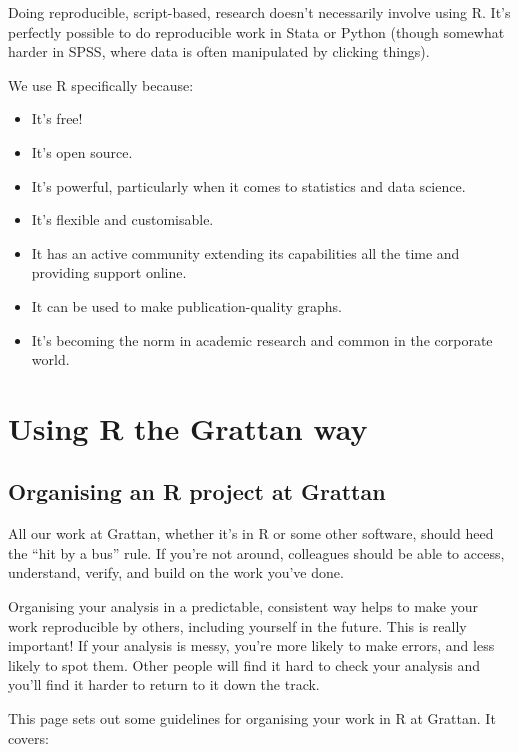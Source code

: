 \documentclass[
]{book}
\providecommand{\tightlist}{%
  \setlength{\itemsep}{0pt}\setlength{\parskip}{0pt}}
\begin{document}
Doing reproducible, script-based, research doesn't necessarily involve using R. It's perfectly possible to do reproducible work in Stata or Python (though somewhat harder in SPSS, where data is often manipulated by clicking things).

We use R specifically because:

\begin{itemize}
\tightlist
\item
  It's free!
\item
  It's open source.
\item
  It's powerful, particularly when it comes to statistics and data science.
\item
  It's flexible and customisable.
\item
  It has an active community extending its capabilities all the time and providing support online.
\item
  It can be used to make publication-quality graphs.
\item
  It's becoming the norm in academic research and common in the corporate world.
\end{itemize}

\hypertarget{part-using-r-the-grattan-way}{%
\part{Using R the Grattan way}\label{part-using-r-the-grattan-way}}

\hypertarget{organising-projects}{%
\chapter{Organising an R project at Grattan}\label{organising-projects}}

All our work at Grattan, whether it's in R or some other software, should heed the ``hit by a bus'' rule. If you're not around, colleagues should be able to access, understand, verify, and build on the work you've done.

Organising your analysis in a predictable, consistent way helps to make your work reproducible by others, including yourself in the future. This is really important! If your analysis is messy, you're more likely to make errors, and less likely to spot them. Other people will find it hard to check your analysis and you'll find it harder to return to it down the track.

This page sets out some guidelines for organising your work in R at Grattan. It covers:
\end{document}
